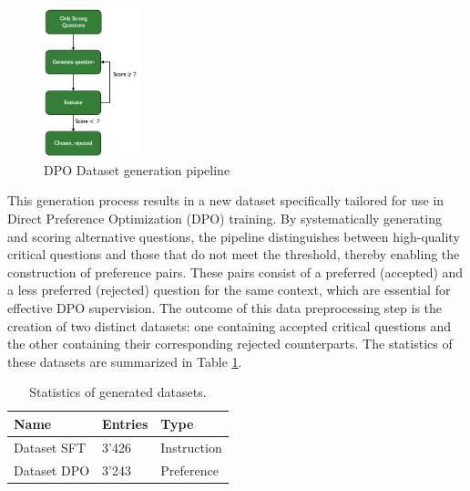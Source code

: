 \documentclass[11pt]{article}
\begin{document}
\begin{figure}[H]
    \centering
    \includegraphics[width=0.25\textwidth]{images/DPO dataset generation.png}
    \caption{DPO Dataset generation pipeline}
    \label{fig:dpo pipeline}
\end{figure}
This generation process results in a new dataset specifically tailored for use in Direct Preference Optimization (DPO) training. By systematically generating and scoring alternative questions, the pipeline distinguishes between high-quality critical questions and those that do not meet the threshold, thereby enabling the construction of preference pairs. These pairs consist of a preferred (accepted) and a less preferred (rejected) question for the same context, which are essential for effective DPO supervision. The outcome of this data preprocessing step is the creation of two distinct datasets: one containing accepted critical questions and the other containing their corresponding rejected counterparts. The statistics of these datasets are summarized in Table \ref{tab:stats of datasets}.
\begin{table}[H]
\centering
\begin{tabular}{lll}
\hline
\textbf{Name} & \textbf{Entries} & \textbf{Type}\\
\hline
Dataset SFT & 3'426 & Instruction\\
Dataset DPO & 3'243 & Preference\\\hline
\end{tabular}
\caption{Statistics of generated datasets.}
\label{tab:stats of datasets}
\end{table}
\end{document}
